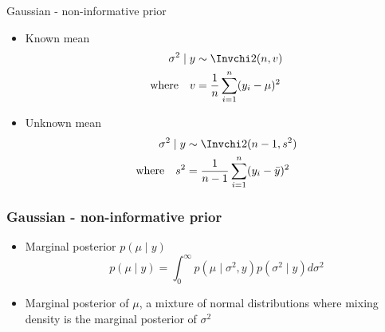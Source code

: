 \documentclass[10pt]{beamer}
\begin{document}
\begin{frame}{Gaussian - non-informative prior}

  \begin{itemize}
  \item[] Known mean
    \begin{align*}
      \sigma^2 \mid y & \sim \Invchi2(n,v)\\
      \text{where} \quad v&=\frac{1}{n}\sum_{i=1}^{n}(y_i-\mu)^2
    \end{align*}
    \pause
  \item[] Unknown mean
    \begin{align*}
      \sigma^2 \mid y & \sim \Invchi2(n-1,s^2)\\
      \text{where} \quad s^2&=\frac{1}{n-1}\sum_{i=1}^{n}(y_i-\bar{y})^2
  \end{align*}
    \end{itemize}

\end{frame}

\begin{frame}
  \frametitle{Gaussian - non-informative prior}

 \begin{itemize}
  \item Marginal posterior $p(\mu \mid y)$
   \begin{equation*}
     p(\mu \mid y)=\int_0^\infty p(\mu \mid \sigma^2,y)p(\sigma^2 \mid y)d\sigma^2
    \end{equation*}
   \item Marginal posterior of $\mu$, a mixture of normal
     distributions where mixing density is the marginal posterior of
      $\sigma^2$
\end{itemize}

\end{frame}
\end{document}
